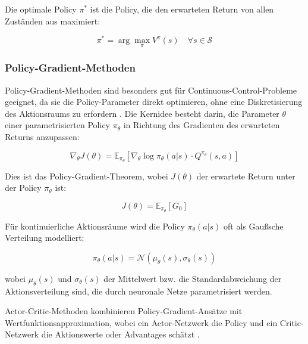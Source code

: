 Die optimale Policy $\pi^*$ ist die Policy, die den erwarteten Return von allen Zuständen aus maximiert:

\begin{equation}
\pi^* = \arg\max_\pi V^\pi(s) \quad \forall s \in \mathcal{S}
\end{equation}

\subsubsection{Policy-Gradient-Methoden}

Policy-Gradient-Methoden sind besonders gut für Continuous-Control-Probleme geeignet, da sie die Policy-Parameter direkt optimieren, ohne eine Diskretisierung des Aktionsraums zu erfordern \cite{Sutton2000}. Die Kernidee besteht darin, die Parameter $\theta$ einer parametrisierten Policy $\pi_\theta$ in Richtung des Gradienten des erwarteten Returns anzupassen:

\begin{equation}
\nabla_\theta J(\theta) = \mathbb{E}_{\pi_\theta} \left[\nabla_\theta \log \pi_\theta(a|s) \cdot Q^{\pi_\theta}(s,a)\right]
\end{equation}

Dies ist das Policy-Gradient-Theorem, wobei $J(\theta)$ der erwartete Return unter der Policy $\pi_\theta$ ist:

\begin{equation}
J(\theta) = \mathbb{E}_{\pi_\theta} \left[G_0\right]
\end{equation}

Für kontinuierliche Aktionsräume wird die Policy $\pi_\theta(a|s)$ oft als Gaußsche Verteilung modelliert:

\begin{equation}
\pi_\theta(a|s) = \mathcal{N}(\mu_\theta(s), \sigma_\theta(s))
\end{equation}

wobei $\mu_\theta(s)$ und $\sigma_\theta(s)$ der Mittelwert bzw. die Standardabweichung der Aktionsverteilung sind, die durch neuronale Netze parametrisiert werden.

Actor-Critic-Methoden kombinieren Policy-Gradient-Ansätze mit Wertfunktionsapproximation, wobei ein Actor-Netzwerk die Policy und ein Critic-Netzwerk die Aktionswerte oder Advantages schätzt \cite{Konda2000}.